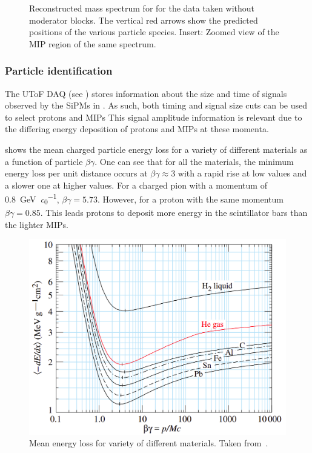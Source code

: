 \begin{figure}[h]
  \begin{adjustbox}{max totalsize=\textwidth, center}
    
  \end{adjustbox}
  \caption[Reconstructed mass spectrum for \SThree]{Reconstructed mass spectrum for \SThree for the data taken without moderator blocks. The vertical red arrows show the predicted positions of the various particle species. Insert: Zoomed view of the MIP region of the same spectrum.}
  \label{fig:s3MassDistribution}
\end{figure}

\subsubsection{Particle identification}
\label{sec:hptpc_beam_flux:methods:s3:pid}

The UToF DAQ (see ) stores information about the size and time of signals observed by the SiPMs in \SThree.
As such, both timing and signal size cuts can be used to select protons and MIPs
This signal amplitude information is relevant due to the differing energy deposition of protons and MIPs at these momenta.

 shows the mean charged particle energy loss for a variety of different materials as a function of particle $\beta \gamma$.
One can see that for all the materials, the minimum energy loss per unit distance occurs at $\beta\gamma \approx 3$ with a rapid rise at low values and a slower one at higher values.
For a charged pion with a momentum of \SI{0.8}{\giga\electronvolt\per\clight}, $\beta\gamma = 5.73$.
However, for a proton with the same momentum $\beta\gamma = 0.85$.
This leads protons to deposit more energy in the scintillator bars than the lighter MIPs.

\begin{figure}[h]
  \centering
  \includegraphics[width=.6\linewidth]{files/figures/hptpc_beam_flux/energyLoss}
  \caption[Mean energy loss for a variety of different materials.]{Mean energy loss for variety of different materials. Taken from~\cite{pdg2020}.}
  \label{fig:energyLoss}
\end{figure}

